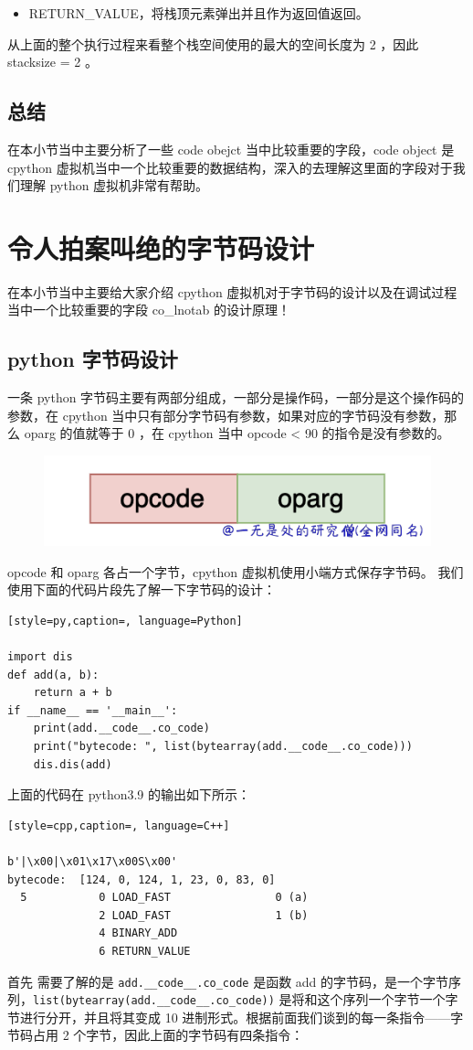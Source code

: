 \begin{itemize}
\item RETURN\_VALUE，将栈顶元素弹出并且作为返回值返回。 
\end{itemize}
从上面的整个执行过程来看整个栈空间使用的最大的空间长度为 2 ，因此 stacksize = 2 。
\subsection{总结}
在本小节当中主要分析了一些 code obejct 当中比较重要的字段，code object 是 cpython 虚拟机当中一个比较重要的数据结构，深入的去理解这里面的字段对于我们理解 python 虚拟机非常有帮助。

\section{令人拍案叫绝的字节码设计}
在本小节当中主要给大家介绍 cpython 虚拟机对于字节码的设计以及在调试过程当中一个比较重要的字段 co\_lnotab 的设计原理！
\subsection{python 字节码设计}
一条 python 字节码主要有两部分组成，一部分是操作码，一部分是这个操作码的参数，在 cpython 当中只有部分字节码有参数，如果对应的字节码没有参数，那么 oparg 的值就等于 0 ，在 cpython 当中 opcode < 90 的指令是没有参数的。

    \begin{figure}[H]
        \centering
            \includegraphics[scale=.25]{images/45-bytecode.png}
						\caption{ }
        \label{fig:my_label}
    \end{figure}

opcode 和 oparg 各占一个字节，cpython 虚拟机使用小端方式保存字节码。
我们使用下面的代码片段先了解一下字节码的设计：
\begin{lstlisting}[style=py,caption=, language=Python]

import dis
def add(a, b):
    return a + b
if __name__ == '__main__':
    print(add.__code__.co_code)
    print("bytecode: ", list(bytearray(add.__code__.co_code)))
    dis.dis(add)
\end{lstlisting}
上面的代码在 python3.9 的输出如下所示：
\begin{lstlisting}[style=cpp,caption=, language=C++]

b'|\x00|\x01\x17\x00S\x00'
bytecode:  [124, 0, 124, 1, 23, 0, 83, 0]
  5           0 LOAD_FAST                0 (a)
              2 LOAD_FAST                1 (b)
              4 BINARY_ADD
              6 RETURN_VALUE
\end{lstlisting}
首先 需要了解的是 \verb|add.__code__.co_code| 是函数 add 的字节码，是一个字节序列，\verb|list(bytearray(add.__code__.co_code))| 是将和这个序列一个字节一个字节进行分开，并且将其变成 10 进制形式。根据前面我们谈到的每一条指令——字节码占用 2 个字节，因此上面的字节码有四条指令：

